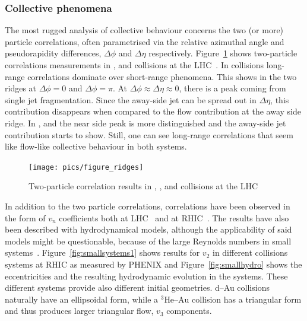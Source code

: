 
\subsubsection{Collective phenomena}
The most rugged analysis of collective behaviour concerns the two (or more) particle correlations, often parametrised via the relative azimuthal angle and pseudorapidity differences, $\Delta \phi$ and $\Delta \eta$ respectively. Figure~\ref{fig:smallsystems2} shows two-particle correlations measurements in \PbPb, \pPb and \pp collisions at the LHC~\cite{Aad:2015gqa}. In \PbPb collisions long-range correlations dominate over short-range phenomena. This shows in the two ridges at $\Delta \phi = 0 $ and $\Delta \phi = \pi$. At $\Delta\phi\approx\Delta\eta\approx0$, there is a peak coming from single jet fragmentation. Since the away-side jet can be spread out in $\Delta\eta$, this contribution disappears when compared to the flow contribution at the away side ridge. In \pPb, and \pp the near side peak is more distinguished and the away-side jet contribution starts to show. Still, one can see long-range correlations that seem like flow-like collective behaviour in both systems. 
\begin{figure}[b!]
\centering
            	\texttt{[image: pics/figure\_ridges]}
                \caption{Two-particle correlation results in \PbPb, \pPb, and \pp collisions at the LHC~\cite{Aad:2015gqa} }
	\label{fig:smallsystems2}
\end{figure}

In addition to the two particle correlations, correlations have been observed in the form of $v_n$ coefficients both at LHC~\cite{Acharya:2017ino} and at RHIC~\cite{Aidala:2016vgl}. The results have also been described  with hydrodynamical models, although the applicability of said models might be questionable, because of the large Reynolds numbers in small systems~\cite{Shen:2016zpp,Niemi:2014wta}. Figure~\ref{fig:smallsystems1} shows results for $v_2$ in different collisions systems at RHIC as measured by PHENIX and Figure~\ref{fig:smallhydro} shows the eccentricities and the resulting hydrodynamic evolution in the systems. These different systems provide also different initial geometries. d--Au collisions naturally have an ellipsoidal form, while a $^3\mbox{He--Au}$ collision has a triangular form and thus produces larger triangular flow, $v_3$ components. 


